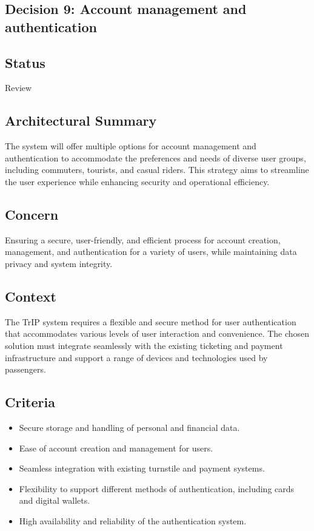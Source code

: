\subsection{Decision 9: Account management and authentication}

\subsection*{Status}
Review

\subsection*{Architectural Summary}
The system will offer multiple options for account management and authentication to accommodate the preferences and needs of diverse user groups, including commuters, tourists, and casual riders. This strategy aims to streamline the user experience while enhancing security and operational efficiency.

\subsection*{Concern}
Ensuring a secure, user-friendly, and efficient process for account creation, management, and authentication for a variety of users, while maintaining data privacy and system integrity.

\subsection*{Context}
The TrIP system requires a flexible and secure method for user authentication that accommodates various levels of user interaction and convenience. The chosen solution must integrate seamlessly with the existing ticketing and payment infrastructure and support a range of devices and technologies used by passengers.

\subsection*{Criteria}
\begin{itemize}
    \item Secure storage and handling of personal and financial data.
    \item Ease of account creation and management for users.
    \item Seamless integration with existing turnstile and payment systems.
    \item Flexibility to support different methods of authentication, including cards and digital wallets.
    \item High availability and reliability of the authentication system.
\end{itemize}

